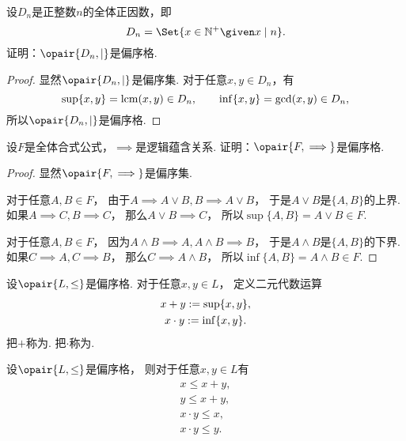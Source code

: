 \begin{example}
设\(D_n\)是正整数\(n\)的全体正因数，即\begin{equation*}
	D_n = \Set{ x\in\mathbb{N}^+ \given x \mid n }.
\end{equation*}
证明：\(\opair{D_n,\mid}\)是偏序格.
\begin{proof}
显然\(\opair{D_n,\mid}\)是偏序集.
对于任意\(x,y \in D_n\)，有\begin{equation*}
	\sup\{x,y\}
	= \operatorname{lcm}(x,y)
	\in D_n,
	\qquad
	\inf\{x,y\}
	= \operatorname{gcd}(x,y)
	\in D_n,
\end{equation*}
所以\(\opair{D_n,\mid}\)是偏序格.
\end{proof}
\end{example}

\begin{example}
设\(F\)是全体合式公式，\(\implies\)是逻辑蕴含关系.
证明：\(\opair{F,\implies}\)是偏序格.
\begin{proof}
显然\(\opair{F,\implies}\)是偏序集.

对于任意\(A,B \in F\)，
由于\(A \implies A \lor B,
B \implies A \lor B\)，
于是\(A \lor B\)是\(\{A,B\}\)的上界.
如果\(A \implies C,
B \implies C\)，
那么\(A \lor B \implies C\)，
所以\(\sup\{A,B\}
= A \lor B
\in F\).

对于任意\(A,B \in F\)，
因为\(A \land B \implies A,
A \land B \implies B\)，
于是\(A \land B\)是\(\{A,B\}\)的下界.
如果\(C \implies A,
C \implies B\)，
那么\(C \implies A \land B\)，
所以\(\inf\{A,B\}
= A \land B
\in F\).
\end{proof}
\end{example}

\begin{definition}
设\(\opair{L,\leq}\)是偏序格.
对于任意\(x,y \in L\)，
定义二元代数运算\begin{gather*}
	x + y := \sup\{x,y\}, \\
	x \cdot y := \inf\{x,y\}.
\end{gather*}
把\(+\)称为.
把\(\cdot\)称为.
\end{definition}

\begin{theorem}
设\(\opair{L,\leq}\)是偏序格，
则对于任意\(x,y \in L\)有\begin{gather*}
	x \leq x + y, \\
	y \leq x + y, \\
	x \cdot y \leq x, \\
	x \cdot y \leq y.
\end{gather*}
\end{theorem}

